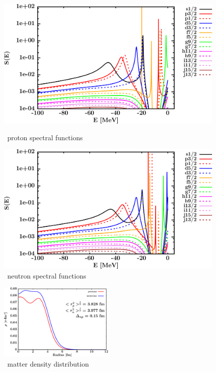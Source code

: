 \begin{figure}[H]
    \centering
    \begin{minipage}{0.45\textwidth}
        \centering
        \includegraphics[width=1.0\textwidth]{figures/ni64_protonSpectralFunctions.png}
        \caption{\niFour\ proton spectral functions}
        \label{DOMFitData_ni64_proton_spectralFunctions}
    \end{minipage}\hfill
    \begin{minipage}{0.45\textwidth}
        \centering
        \includegraphics[width=1.0\textwidth]{figures/ni64_neutronSpectralFunctions.png}
        \caption{\niFour\ neutron spectral functions}
        \label{DOMFitData_ni64_neutron_spectralFunctions}
    \end{minipage}
\end{figure}

\begin{figure}[H]
    \centering
    \includegraphics[width = 0.5\textwidth]{figures/ni64_matterDensity.png}
    \caption{\niFour\ matter density distribution}
    \label{DOMFitData_ni64_matterDensity}
\end{figure}

